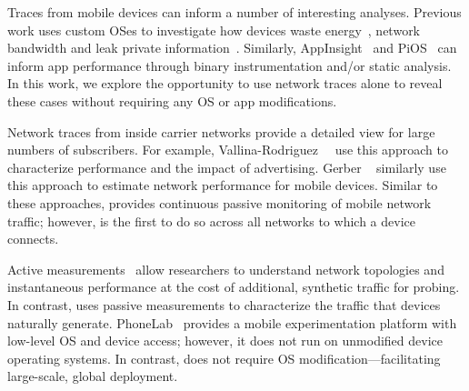 Traces from mobile devices can inform a number of interesting analyses. Previous work 
uses custom OSes to investigate how devices waste energy~\cite{pathak:eprof}, network bandwidth and 
leak private information~\cite{enck:taintdroid,hornyack:appfence}. Similarly, AppInsight~\cite{ravindranath:appinsight} and PiOS~\cite{egele:pios} can inform 
app performance through binary instrumentation and/or static analysis. In this work, we explore the opportunity to use network traces 
alone to reveal these cases without requiring any OS or app modifications. 

Network traces from inside carrier networks provide a detailed view for large numbers 
of subscribers. For example, Vallina-Rodriguez~\etal~\cite{vallina-rod:ads} use this approach to characterize performance and 
the impact of advertising. Gerber \etal~\cite{gerber:passivespeed} similarly use this approach to 
estimate network performance for mobile devices.  %
Similar to these approaches, \platname provides continuous passive monitoring of mobile network 
traffic; however, \platname is the first to do so across all networks to which a device connects.

Active measurements~\cite{wang:middleboxes,sommers:cellwifi} allow researchers to understand network topologies and instantaneous 
performance at the cost of additional, synthetic traffic for probing. In contrast, \platname uses 
passive measurements to characterize the traffic that devices
naturally generate. PhoneLab~\cite{PhoneLab} provides a mobile experimentation platform with 
low-level OS and device access; however, it does not run on unmodified device operating systems. 
In contrast, \meddle does not require OS modification---facilitating large-scale, global deployment.




